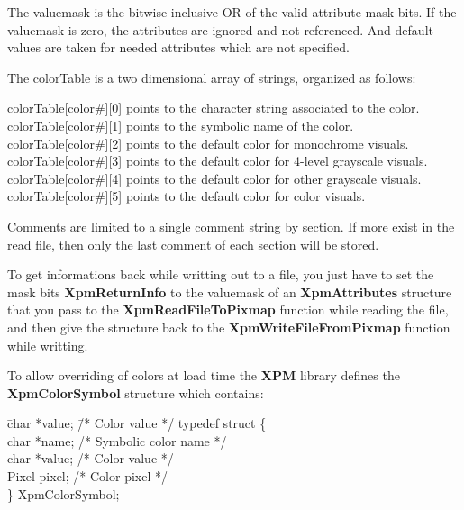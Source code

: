The valuemask is the bitwise inclusive OR of the valid attribute mask bits. If
the valuemask is zero, the attributes are ignored and not referenced. And
default values are taken for needed attributes which are not specified.

The colorTable is a two dimensional array of strings, organized as follows:
\begin{flushleft}
\hspace{.5cm}colorTable[color\#][0] points to the character string associated
to the color.\\
\hspace{.5cm}colorTable[color\#][1] points to the symbolic name of the color.\\
\hspace{.5cm}colorTable[color\#][2] points to the default color for monochrome
visuals.\\
\hspace{.5cm}colorTable[color\#][3] points to the default color for 4-level
grayscale visuals.\\
\hspace{.5cm}colorTable[color\#][4] points to the default color for other
grayscale visuals.\\
\hspace{.5cm}colorTable[color\#][5] points to the default color for color
visuals. 
\end{flushleft}

Comments are limited to a single comment string by section. If more exist in
the read file, then only the last comment of each section will be stored.

To get informations back while writting out to a file, you just have to set
the mask bits {\bf XpmReturnInfo} to the valuemask of an {\bf XpmAttributes}
structure that you pass to the {\bf XpmReadFileToPixmap} function while reading
the file, and then give the structure back to the {\bf XpmWriteFileFromPixmap}
function while writting.

\vspace{.5cm}
To allow overriding of colors at load time the {\bf XPM} library defines the
{\bf XpmColorSymbol} structure which contains:

\begin{tabbing}
\hspace{1cm}\= char *value; \hspace{1.5cm}\= /* Color value */\kill
typedef struct \{\\
\> char *name; \> /* Symbolic color name */\\
\> char *value;\> /* Color value */\\
\> Pixel pixel;\> /* Color pixel */\\
\} XpmColorSymbol;
\end{tabbing}

